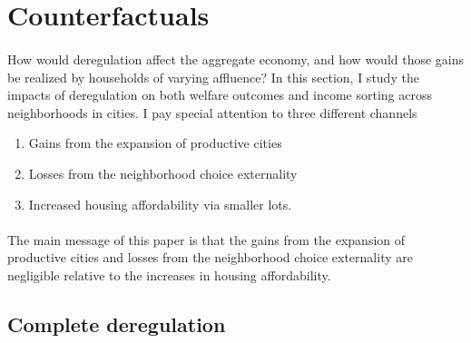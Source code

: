 \documentclass[11pt]{article}
\begin{document}


\section{Counterfactuals}\label{Section:Counterfactuals}
\paragraph{}
How would deregulation affect the aggregate economy, and how would those gains be realized by households of varying affluence? In this section, I study the impacts of deregulation on both welfare outcomes and income sorting across neighborhoods in cities. I pay special attention to three different channels

\begin{enumerate}
	\item Gains from the expansion of productive cities \citep{hseihmoretti, durantonpugaurbgrowth}
	
	\item Losses from the neighborhood choice externality \citep{hamilton1976, calabresetal}
	
	\item Increased housing affordability via smaller lots.
\end{enumerate}

\paragraph*{}
The main message of this paper is that the gains from the expansion of productive cities and losses from the neighborhood choice externality are negligible relative to the increases in housing affordability. 

\subsection{Complete deregulation}
\end{document}
